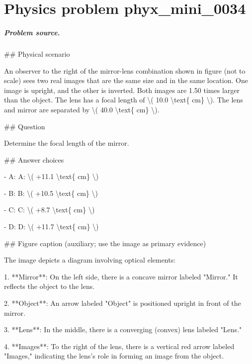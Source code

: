 
\chapter{Physics problem phyx\_mini\_0034}
\label{ch:PhyXMiniProblems_problem_phyx_mini_0034}

\paragraph{Problem source.}
\#\# Physical scenario

An observer to the right of the mirror-lens combination shown in figure (not to scale) sees two real images that are the same size and in the same location. One image is upright, and the other is inverted. Both images are 1.50 times larger than the object. The lens has a focal length of \textbackslash{}( 10.0 \textbackslash{}text\{ cm\} \textbackslash{}). The lens and mirror are separated by \textbackslash{}( 40.0 \textbackslash{}text\{ cm\} \textbackslash{}).

\#\# Question

Determine the focal length of the mirror.

\#\# Answer choices

- A: A: \textbackslash{}( +11.1 \textbackslash{}text\{ cm\} \textbackslash{})

- B: B: \textbackslash{}( +10.5 \textbackslash{}text\{ cm\} \textbackslash{})

- C: C: \textbackslash{}( +8.7 \textbackslash{}text\{ cm\} \textbackslash{})

- D: D: \textbackslash{}( +11.7 \textbackslash{}text\{ cm\} \textbackslash{})

\#\# Figure caption (auxiliary; use the image as primary evidence)

The image depicts a diagram involving optical elements:

1. **Mirror**: On the left side, there is a concave mirror labeled "Mirror." It reflects the object to the lens.

2. **Object**: An arrow labeled "Object" is positioned upright in front of the mirror.

3. **Lens**: In the middle, there is a converging (convex) lens labeled "Lens." 

4. **Images**: To the right of the lens, there is a vertical red arrow labeled "Images," indicating the lens's role in forming an image from the object.

